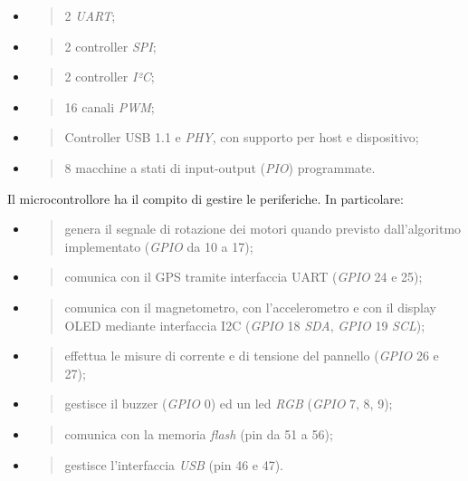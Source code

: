 \begin{itemize}
\item
  \begin{quote}
  2 \emph{UART};
  \end{quote}
\item
  \begin{quote}
  2 controller \emph{SPI};
  \end{quote}
\item
  \begin{quote}
  2 controller \emph{I²C};
  \end{quote}
\item
  \begin{quote}
  16 canali \emph{PWM};
  \end{quote}
\item
  \begin{quote}
  Controller USB 1.1 e \emph{PHY}, con supporto per host e dispositivo;
  \end{quote}
\item
  \begin{quote}
  8 macchine a stati di input-output (\emph{PIO}) programmate.
  \end{quote}
\end{itemize}

\noindent Il microcontrollore ha il compito di gestire le periferiche. In
particolare:

\begin{itemize}
\item
  \begin{quote}
  genera il segnale di rotazione dei motori quando previsto
  dall'algoritmo implementato (\emph{GPIO} da 10 a 17);
  \end{quote}
\item
  \begin{quote}
  comunica con il GPS tramite interfaccia UART (\emph{GPIO} 24 e 25);
  \end{quote}
\item
  \begin{quote}
  comunica con il magnetometro, con l'accelerometro e con il display
  OLED mediante interfaccia I2C (\emph{GPIO} 18 \emph{SDA}, \emph{GPIO}
  19 \emph{SCL});
  \end{quote}
\item
  \begin{quote}
  effettua le misure di corrente e di tensione del pannello (\emph{GPIO}
  26 e 27);
  \end{quote}
\item
  \begin{quote}
  gestisce il buzzer (\emph{GPIO} 0) ed un led \emph{RGB} (\emph{GPIO}
  7, 8, 9);
  \end{quote}
\item
  \begin{quote}
  comunica con la memoria \emph{flash} (pin da 51 a 56);
  \end{quote}
\item
  \begin{quote}
  gestisce l'interfaccia \emph{USB} (pin 46 e 47).
  \end{quote}
\end{itemize}

